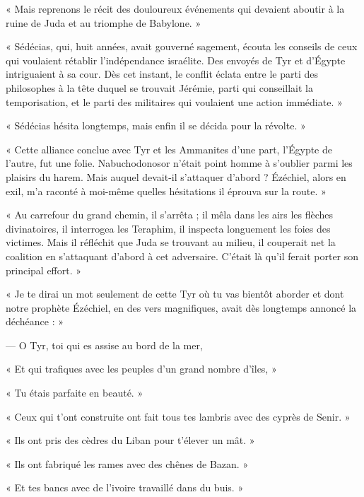 \documentclass[a4paper, 11pt, oneside, polutonikogreek, french]{article}
\begin{document}
\bigskip
\centerline{\EightStarTaper}
\centerline{\EightStarTaper\EightStarTaper}
\bigskip

« Mais reprenons le récit des douloureux événements qui devaient aboutir à la ruine de Juda et au triomphe de Babylone. »

« Sédécias, qui, huit années, avait gouverné sagement, écouta les conseils de ceux qui voulaient rétablir l'indépendance israélite. Des envoyés de Tyr et d'Égypte intriguaient à sa cour. Dès cet instant, le conflit éclata entre le parti des philosophes à la tête duquel se trouvait Jérémie, parti qui conseillait la temporisation, et le parti des militaires qui voulaient une action immédiate. »

« Sédécias hésita longtemps, mais enfin il se décida pour la révolte. »

« Cette alliance conclue avec Tyr et les Ammanites d'une part, l'Égypte de l'autre, fut une folie. Nabuchodonosor n'était point homme à s'oublier parmi les plaisirs du harem. Mais auquel devait-il s'attaquer d'abord ? Ézéchiel, alors en exil, m'a raconté à moi-même quelles hésitations il éprouva sur la route. »

« Au carrefour du grand chemin, il s'arrêta ; il mêla dans les airs les flèches divinatoires, il interrogea les Teraphim, il inspecta longuement les foies des victimes. Mais il réfléchit que Juda se trouvant au milieu, il couperait net la coalition en s'attaquant d'abord à cet adversaire. C'était là qu'il ferait porter son principal effort. »

« Je te dirai un mot seulement de cette Tyr où tu vas bientôt aborder et dont notre prophète Ézéchiel, en des vers magnifiques, avait dès longtemps annoncé la déchéance : »

\bigskip
\centerline{\EightStarTaper}
\centerline{\EightStarTaper\EightStarTaper}
\bigskip

--- O Tyr, toi qui es assise au bord de la mer,

« Et qui trafiques avec les peuples d'un grand nombre d'îles, »

« Tu étais parfaite en beauté. »

« Ceux qui t'ont construite ont fait tous tes lambris avec des cyprès de Senir. »

« Ils ont pris des cèdres du Liban pour t'élever un mât. »

« Ils ont fabriqué les rames avec des chênes de Bazan. »

« Et tes bancs avec de l'ivoire travaillé dans du buis. »
\end{document}
